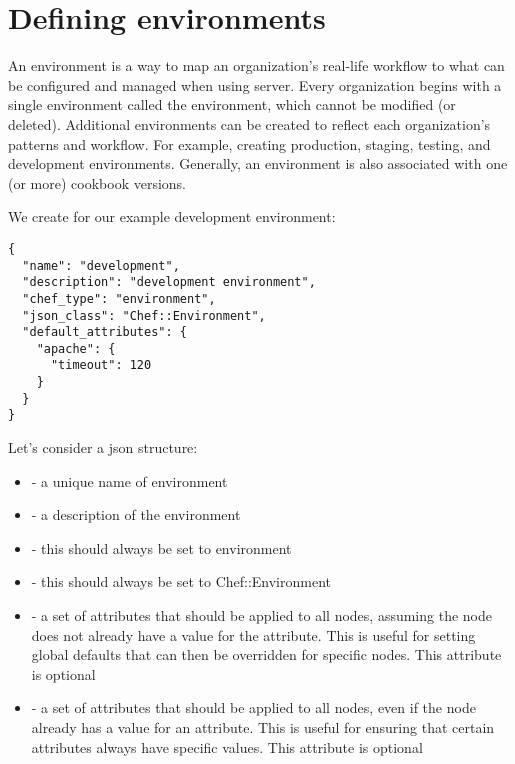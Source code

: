 \section{Defining environments}
\label{sec:solo-environment}

An environment is a way to map an organization's real-life workflow to what can be configured and managed when using server. Every organization begins with a single environment called the  environment, which cannot be modified (or deleted). Additional environments can be created to reflect each organization's patterns and workflow. For example, creating production, staging, testing, and development environments. Generally, an environment is also associated with one (or more) cookbook versions.

We create for our example development environment:

\begin{lstlisting}[label=lst:my-cloud-chef-environment1,title=my-cloud/environments/development.json]
{
  "name": "development",
  "description": "development environment",
  "chef_type": "environment",
  "json_class": "Chef::Environment",
  "default_attributes": {
    "apache": {
      "timeout": 120
    }
  }
}
\end{lstlisting}

Let's consider a json structure:

\begin{itemize}
  \item {} - a unique name of environment
  \item {} - a description of the environment
  \item {} - this should always be set to environment
  \item {} - this should always be set to Chef::Environment
  \item {} - a set of attributes that should be applied to all nodes, assuming the node does not already have a value for the attribute. This is useful for setting global defaults that can then be overridden for specific nodes. This attribute is optional
  \item {} - a set of attributes that should be applied to all nodes, even if the node already has a value for an attribute. This is useful for ensuring that certain attributes always have specific values. This attribute is optional
\end{itemize}

